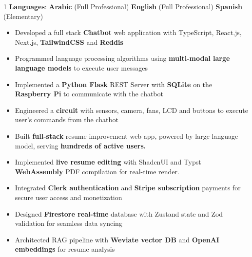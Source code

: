 \documentclass[11pt,a4paper,ragged2e]{altacv}
\begin{document}
\begin{paracol}{1}
\textbf{Languages}:  \textbf{Arabic} (Full Professional) \hfill \textbf{English} (Full Professional) \hfill \textbf{Spanish} (Elementary)

\medskip

\begin{itemize}
  \item Developed a full stack \textbf{Chatbot} web application with TypeScript, React.js, Next.js, \textbf{TailwindCSS} and \textbf{Reddis}
  \item Programmed language processing algorithms using \textbf{multi-modal large language models} to execute user messages
  \item Implemented a \textbf{Python Flask} REST Server with \textbf{SQLite} on the \textbf{Raspberry Pi} to communicate with the chatbot
  \item Engineered a \textbf{circuit} with sensors, camera, fans, LCD and buttons to execute user's commands from the chatbot 
  \end{itemize}

  \medskip



\begin{itemize}
\item Built \textbf{full-stack} resume-improvement web app, powered by large language model, serving \textbf{hundreds of active users.}
\item Implemented \textbf{live resume editing} with ShadcnUI and Typst \textbf{WebAssembly} PDF compilation for real-time render.
\item Integrated \textbf{Clerk authentication} and \textbf{Stripe subscription} payments for secure user access and monetization
\item Designed \textbf{Firestore real-time} database with Zustand state and Zod validation for seamless data syncing
\item Architected RAG pipeline with \textbf{Weviate vector DB} and \textbf{OpenAI embeddings} for resume analysis
\end{itemize}
\tightdivider


\end{paracol}
\end{document}
